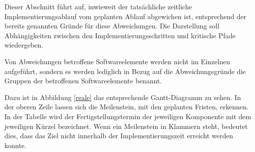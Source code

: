 \documentclass[parskip=full]{scrartcl}
\begin{document}
Dieser Abschnitt führt auf, inwieweit der tatsächliche zeitliche Implementierungsablauf vom geplanten Ablauf abgewichen ist, entsprechend der bereits genannten Gründe für diese Abweichungen. Die Darstellung soll Abhängigkeiten zwischen den Implementierungsschritten und kritische Pfade wiedergeben.

Von Abweichungen betroffene Softwareelemente werden nicht im Einzelnen aufgeführt, sondern es werden lediglich in Bezug auf die Abweichungsgründe die Gruppen der betroffenen Softwareelemente benannt.

Dazu ist in Abbildung \ref{reale} das entsprechende Gantt-Diagramm zu sehen. In der oberen Zeile lassen sich die Meilenstein, mit den geplanten Fristen, erkennen. In der Tabelle wird  der Fertigstellungstermin der jeweiligen Komponente mit dem jeweiligen Kürzel bezeichnet. Wenn ein Meilenstein in Klammern steht, bedeutet dies, dass das Ziel nicht innerhalb der Implementierungszeit erreicht werden konnte.

\clearpage
\end{document}
